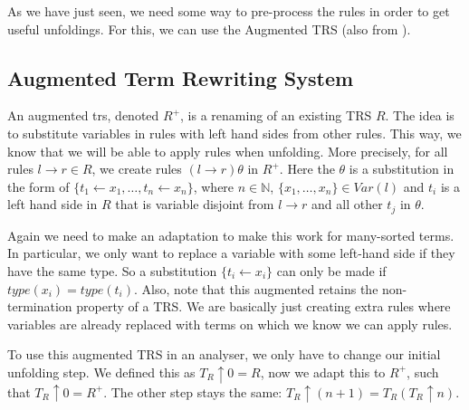 As we have just seen, we need some way to pre-process the rules in order to get useful unfoldings. For this, we can use the Augmented TRS (also from \cite{Payet:Unfolding}).  

\subsection*{Augmented Term Rewriting System}
An augmented trs, denoted $R^+$, is a renaming of an existing TRS $R$. The idea is to substitute variables in rules with left hand sides from other rules. This way, we know that we will be able to apply rules when unfolding. More precisely, for all rules $l \rightarrow r \in R$, we create rules $(l \rightarrow r)\theta$ in $R^+$. Here the $\theta$ is a substitution in the form of $\{ t_1 \leftarrow x_1, \dots, t_n \leftarrow x_n \}$, where $n \in \mathbb{N}$, $\{ x_1, \dots, x_n \} \in \textit{Var}(l)$ and $t_i$ is a left hand side in $R$ that is variable disjoint from $l \rightarrow r$ and all other $t_j$ in $\theta$. 

Again we need to make an adaptation to make this work for many-sorted terms. In particular, we only want to replace a variable with some left-hand side if they have the same type. So a substitution $\{ t_i \leftarrow x_i \}$ can only be made if $\textit{type}(x_i) = \textit{type}(t_i)$. Also, note that this augmented retains the non-termination property of a TRS. We are basically just creating extra rules where variables are already replaced with terms on which we know we can apply rules.  

To use this augmented TRS in an analyser, we only have to change our initial unfolding step. We defined this as $T_R \uparrow 0 = R$, now we adapt this to $R^+$, such that $T_R \uparrow 0 = R^+$. The other step stays the same: $T_R \uparrow (n + 1) = T_R(T_R \uparrow n)$. 

